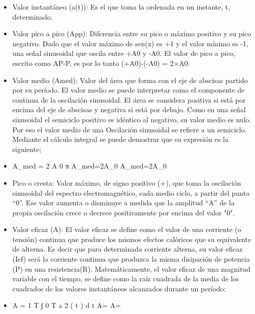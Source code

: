 \documentclass{article}
\begin{document}
\begin{itemize}

    \item Valor instantáneo (a(t)): Es el que toma la ordenada en un instante, t, determinado.

    
    \item Valor pico a pico (App): Diferencia entre su pico o máximo positivo y su pico negativo. Dado que el valor máximo de sen(x) es +1 y el valor mínimo es -1, una señal sinusoidal que oscila entre +A0 y -A0. El valor de pico a pico, escrito como AP-P, es por lo tanto (+A0)-(-A0) = 2×A0.

    \item Valor medio (Amed): Valor del área que forma con el eje de abscisas partido por su período. El valor medio se puede interpretar como el componente de continua de la oscilación sinusoidal. El área se considera positiva si está por encima del eje de abscisas y negativa si está por debajo. Como en una señal sinusoidal el semiciclo positivo es idéntico al negativo, su valor medio es nulo. Por eso el valor medio de una Oscilación sinusoidal se refiere a un semiciclo. Mediante el cálculo integral se puede demostrar que su expresión es la siguiente;

     \item  A_{med} = 2 A 0 π {\displaystyle A_{med}={2A_{0} \over {\pi }}} A_{{med}}={2A_{0} \over {\pi }}

    \item  Pico o cresta: Valor máximo, de signo positivo (+), que toma la oscilación sinusoidal del espectro electromagnético, cada medio ciclo, a partir del punto “0”. Ese valor aumenta o disminuye a medida que la amplitud “A” de la propia oscilación crece o decrece positivamente por encima del valor "0".

    \item Valor eficaz (A): El valor eficaz se define como el valor de una corriente (o tensión) continua que produce los mismos efectos calóricos que su equivalente de alterna. Es decir que para determinada corriente alterna, su valor eficaz (Ief) será la corriente continua que produzca la misma disipación de potencia (P) en una resistencia(R). Matemáticamente, el valor eficaz de una magnitud variable con el tiempo, se define como la raíz cuadrada de la media de los cuadrados de los valores instantáneos alcanzados durante un período:

        \item A = 1 T ∫ 0 T a 2 ( t ) d t {\displaystyle A={}} A={}
\end{itemize}
\end{document}
